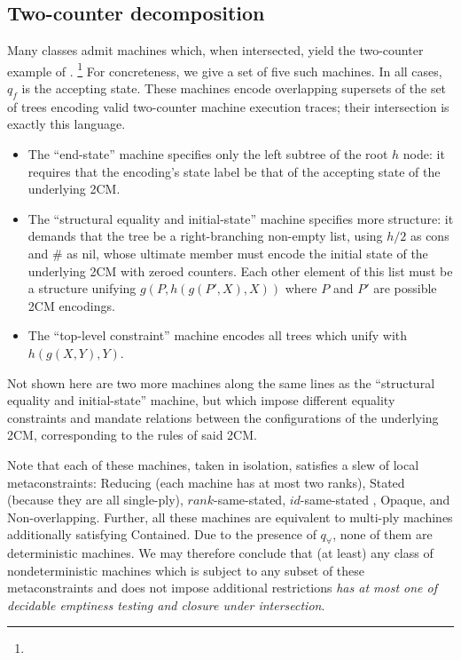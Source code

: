 \subsection{Two-counter decomposition}

Many classes admit machines which, when intersected, yield the two-counter
example of \cite{tata}.%
%
\footnote{}
%
For concreteness, we give a set of five such machines.  In all cases, $q_f$
is the accepting state.  These machines encode overlapping supersets of the
set of trees encoding valid two-counter machine execution traces; their
intersection is exactly this language.  \begin{itemize}
%
  \item The ``end-state'' machine specifies only the left subtree of the
  root $h$ node: it requires that the encoding's state label be that of the
  accepting state of the underlying 2CM.
%
  \item The ``structural equality and initial-state'' machine specifies more
  structure: it demands that the tree be a right-branching non-empty list,
  using $h/2$ as cons and $\#$ as nil, whose ultimate member must encode the
  initial state of the underlying 2CM with zeroed counters.  Each other
  element of this list must be a structure unifying $g(P,h(g(P',X),X))$
  where $P$ and $P'$ are possible 2CM encodings.
%
  \item The ``top-level constraint'' machine encodes all trees which unify
  with $h(g(X,Y),Y)$.
%
\end{itemize} Not shown here are two more machines along the same lines as
the ``structural equality and initial-state'' machine, but which impose
different equality constraints and mandate relations between the
configurations of the underlying 2CM, corresponding to the rules of said
2CM.

Note that each of these machines, taken in isolation, satisfies a slew of
local metaconstraints: Reducing (each machine has at most two ranks), Stated
(because they are all single-ply), $rank$-same-stated, $id$-same-stated
, Opaque, and Non-overlapping.  Further,
all these machines are equivalent to multi-ply machines additionally
satisfying Contained.   Due to the presence of $q_\forall$, none of them are
deterministic machines.  We may therefore conclude that (at least) any class
of nondeterministic machines which is subject to any subset of these
metaconstraints and does not impose additional restrictions {\em has at most
one of decidable emptiness testing and closure under intersection}.

